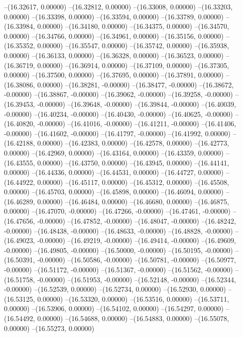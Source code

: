 --(16.32617, 0.00000)
--(16.32812, 0.00000)
--(16.33008, 0.00000)
--(16.33203, 0.00000)
--(16.33398, 0.00000)
--(16.33594, 0.00000)
--(16.33789, 0.00000)
--(16.33984, 0.00000)
--(16.34180, 0.00000)
--(16.34375, 0.00000)
--(16.34570, 0.00000)
--(16.34766, 0.00000)
--(16.34961, 0.00000)
--(16.35156, 0.00000)
--(16.35352, 0.00000)
--(16.35547, 0.00000)
--(16.35742, 0.00000)
--(16.35938, 0.00000)
--(16.36133, 0.00000)
--(16.36328, 0.00000)
--(16.36523, 0.00000)
--(16.36719, 0.00000)
--(16.36914, 0.00000)
--(16.37109, 0.00000)
--(16.37305, 0.00000)
--(16.37500, 0.00000)
--(16.37695, 0.00000)
--(16.37891, 0.00000)
--(16.38086, 0.00000)
--(16.38281, -0.00000)
--(16.38477, -0.00000)
--(16.38672, -0.00000)
--(16.38867, -0.00000)
--(16.39062, -0.00000)
--(16.39258, -0.00000)
--(16.39453, -0.00000)
--(16.39648, -0.00000)
--(16.39844, -0.00000)
--(16.40039, -0.00000)
--(16.40234, -0.00000)
--(16.40430, -0.00000)
--(16.40625, -0.00000)
--(16.40820, -0.00000)
--(16.41016, -0.00000)
--(16.41211, -0.00000)
--(16.41406, -0.00000)
--(16.41602, -0.00000)
--(16.41797, -0.00000)
--(16.41992, 0.00000)
--(16.42188, 0.00000)
--(16.42383, 0.00000)
--(16.42578, 0.00000)
--(16.42773, 0.00000)
--(16.42969, 0.00000)
--(16.43164, 0.00000)
--(16.43359, 0.00000)
--(16.43555, 0.00000)
--(16.43750, 0.00000)
--(16.43945, 0.00000)
--(16.44141, 0.00000)
--(16.44336, 0.00000)
--(16.44531, 0.00000)
--(16.44727, 0.00000)
--(16.44922, 0.00000)
--(16.45117, 0.00000)
--(16.45312, 0.00000)
--(16.45508, 0.00000)
--(16.45703, 0.00000)
--(16.45898, 0.00000)
--(16.46094, 0.00000)
--(16.46289, 0.00000)
--(16.46484, 0.00000)
--(16.46680, 0.00000)
--(16.46875, 0.00000)
--(16.47070, -0.00000)
--(16.47266, -0.00000)
--(16.47461, -0.00000)
--(16.47656, -0.00000)
--(16.47852, -0.00000)
--(16.48047, -0.00000)
--(16.48242, -0.00000)
--(16.48438, -0.00000)
--(16.48633, -0.00000)
--(16.48828, -0.00000)
--(16.49023, -0.00000)
--(16.49219, -0.00000)
--(16.49414, -0.00000)
--(16.49609, -0.00000)
--(16.49805, -0.00000)
--(16.50000, -0.00000)
--(16.50195, -0.00000)
--(16.50391, -0.00000)
--(16.50586, -0.00000)
--(16.50781, -0.00000)
--(16.50977, -0.00000)
--(16.51172, -0.00000)
--(16.51367, -0.00000)
--(16.51562, -0.00000)
--(16.51758, -0.00000)
--(16.51953, -0.00000)
--(16.52148, -0.00000)
--(16.52344, -0.00000)
--(16.52539, 0.00000)
--(16.52734, 0.00000)
--(16.52930, 0.00000)
--(16.53125, 0.00000)
--(16.53320, 0.00000)
--(16.53516, 0.00000)
--(16.53711, 0.00000)
--(16.53906, 0.00000)
--(16.54102, 0.00000)
--(16.54297, 0.00000)
--(16.54492, 0.00000)
--(16.54688, 0.00000)
--(16.54883, 0.00000)
--(16.55078, 0.00000)
--(16.55273, 0.00000)
